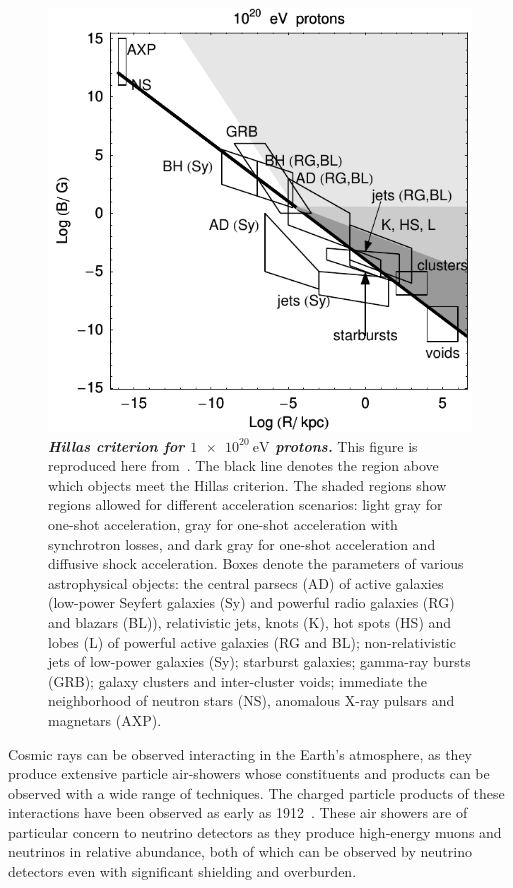 \begin{figure}
	\centering
	\includegraphics[width=0.5\linewidth]{figures/HillasCriterionProton20}
	\caption{\textbf{\textit{Hillas criterion for $\SI{1e20}\eV$ protons.}}
		This figure is reproduced here from~\cite{Ptitsyna:2008zs}.
		The black line denotes the region above which objects meet the Hillas criterion.
		The shaded regions show regions allowed for different acceleration scenarios: light gray for one-shot acceleration, gray for one-shot acceleration with synchrotron losses, and dark gray for one-shot acceleration and diffusive shock acceleration.
		Boxes denote the parameters of various astrophysical objects: the central
		parsecs (AD) of active galaxies (low-power Seyfert galaxies (Sy) and powerful radio galaxies (RG) and blazars (BL)), relativistic jets, knots (K), hot spots (HS) and lobes (L) of powerful active galaxies (RG and BL); non-relativistic jets of low-power galaxies (Sy); starburst	galaxies; gamma-ray bursts (GRB); galaxy clusters and inter-cluster voids; immediate
		the neighborhood of neutron stars (NS), anomalous X-ray pulsars and magnetars (AXP).
	}\label{fig:hillasp20}
\end{figure}

Cosmic rays can be observed interacting in the Earth's atmosphere, as they produce extensive particle air-showers whose constituents and products can be observed with a wide range of techniques.
The charged particle products of these interactions have been observed as early as 1912~\cite{hess1912uber}.
These air showers are of particular concern to neutrino detectors as they produce high-energy muons and neutrinos in relative abundance, both of which can be observed by neutrino detectors even with significant shielding and overburden.


